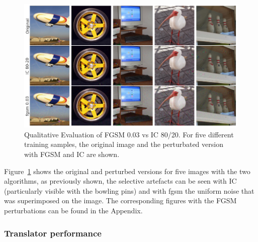 \begin{figure}[ht]
    \centering
    \includegraphics[width=1\textwidth]{plots/advpert_validation_chosen_qual.png}
    \caption[Qualitative Evaluation of FGSM 0.03 vs IC 80/20]{Qualitative Evaluation of FGSM 0.03 vs IC 80/20. For five different training samples, the original image and the perturbated version with FGSM and IC are shown.}\label{fig:advpert_validation_chosen_qual}
\end{figure}

Figure~\ref{fig:advpert_validation_chosen_qual} shows the original and perturbed versions for five images with the two algorithms, as previously shown, the selective artefacts can be seen with IC (particularly visible with the bowling pins) and with fgsm the uniform noise that was superimposed on the image.  The corresponding figures with the FGSM perturbations can be found in the Appendix. 

\subsubsection{Translator performance}

